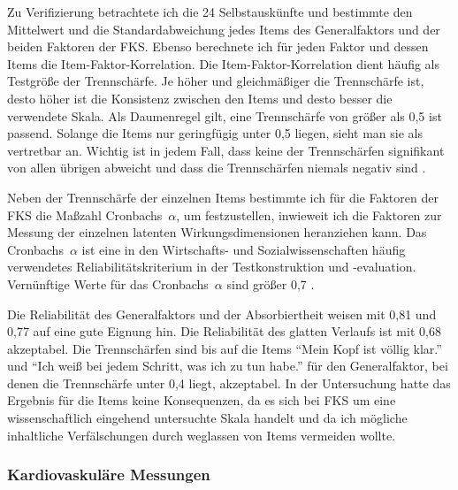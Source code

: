 Zu Verifizierung betrachtete ich die 24 Selbstauskünfte und bestimmte den Mittelwert und die Standardabweichung jedes Items des Generalfaktors und der beiden Faktoren der \ac{FKS}. Ebenso berechnete ich für jeden Faktor und dessen Items die Item-Faktor-Korrelation. Die Item-Faktor-Korrelation dient häufig als Testgröße der Trennschärfe. Je höher und gleichmäßiger die Trennschärfe ist, desto höher ist die Konsistenz zwischen den Items und desto besser die verwendete Skala. Als Daumenregel gilt, eine Trennschärfe von größer als 0,5 ist passend. Solange die Items nur geringfügig unter 0,5 liegen, sieht man sie als vertretbar an. Wichtig ist in jedem Fall, dass keine der Trennschärfen signifikant von allen übrigen abweicht und dass die Trennschärfen niemals negativ sind \citep[vgl.][S.~219f.]{Bortz2006}.

Neben der Trennschärfe der einzelnen Items bestimmte ich für die Faktoren der \ac{FKS} die Maßzahl Cronbachs~$\alpha$, um festzustellen, inwieweit ich die Faktoren zur Messung der einzelnen latenten Wirkungsdimensionen heranziehen kann. Das Cronbachs~$\alpha$ ist eine in den Wirtschafts- und Sozialwissenschaften häufig verwendetes Reliabilitätskriterium in der Testkonstruktion und -evaluation. Vernünftige Werte für das Cronbachs~$\alpha$ sind größer 0,7 \citep[vgl.][S.~189f.]{Bortz2006}.

Die Reliabilität des Generalfaktors und der Absorbiertheit weisen mit 0,81 und 0,77 auf eine gute Eignung hin. Die Reliabilität des glatten Verlaufs ist mit 0,68 akzeptabel. Die Trennschärfen sind bis auf die Items "`Mein Kopf ist völlig klar."' und "`Ich weiß bei jedem Schritt, was ich zu tun habe."' für den Generalfaktor, bei denen die Trennschärfe unter 0,4 liegt, akzeptabel. In der Untersuchung hatte das Ergebnis für die Items keine Konsequenzen, da es sich bei \ac{FKS} um eine wissenschaftlich eingehend untersuchte Skala handelt und da ich mögliche inhaltliche Verfälschungen durch weglassen von Items vermeiden wollte.

\subsubsection{Kardiovaskuläre Messungen}
\label{ssub:kardiovaskulaere_messungen_1}

